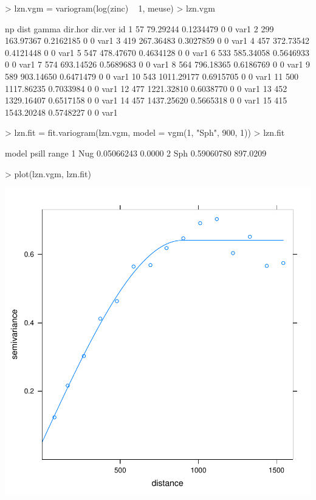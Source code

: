 \documentclass[a4paper]{article}
\begin{document}
\begin{Schunk}
\begin{Sinput}
> lzn.vgm = variogram(log(zinc) ~ 1, meuse)
> lzn.vgm
\end{Sinput}
\begin{Soutput}
    np       dist     gamma dir.hor dir.ver   id
1   57   79.29244 0.1234479       0       0 var1
2  299  163.97367 0.2162185       0       0 var1
3  419  267.36483 0.3027859       0       0 var1
4  457  372.73542 0.4121448       0       0 var1
5  547  478.47670 0.4634128       0       0 var1
6  533  585.34058 0.5646933       0       0 var1
7  574  693.14526 0.5689683       0       0 var1
8  564  796.18365 0.6186769       0       0 var1
9  589  903.14650 0.6471479       0       0 var1
10 543 1011.29177 0.6915705       0       0 var1
11 500 1117.86235 0.7033984       0       0 var1
12 477 1221.32810 0.6038770       0       0 var1
13 452 1329.16407 0.6517158       0       0 var1
14 457 1437.25620 0.5665318       0       0 var1
15 415 1543.20248 0.5748227       0       0 var1
\end{Soutput}
\begin{Sinput}
> lzn.fit = fit.variogram(lzn.vgm, model = vgm(1, "Sph", 900, 1))
> lzn.fit
\end{Sinput}
\begin{Soutput}
  model      psill    range
1   Nug 0.05066243   0.0000
2   Sph 0.59060780 897.0209
\end{Soutput}
\begin{Sinput}
> plot(lzn.vgm, lzn.fit)
\end{Sinput}
\end{Schunk}

\includegraphics{gstat-007}
\end{document}
